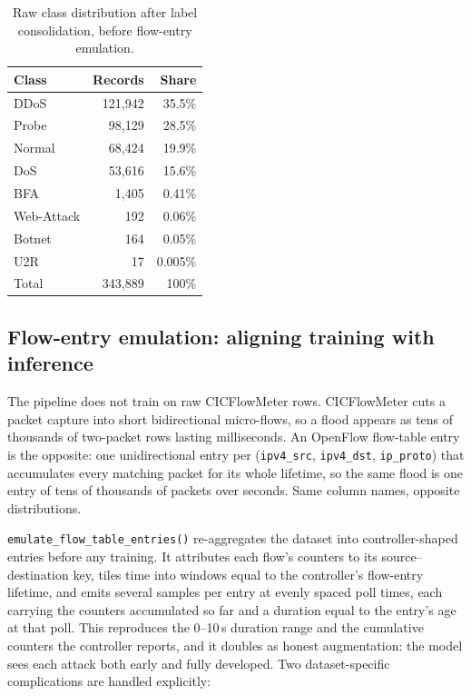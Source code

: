 \documentclass[11pt]{article}
\begin{document}
\begin{table}[h]
\centering
\caption{Raw class distribution after label consolidation, before flow-entry emulation.}
\label{tab:dist}
\begin{tabular}{lrr}
\toprule
Class & Records & Share \\
\midrule
DDoS & 121{,}942 & 35.5\% \\
Probe & 98{,}129 & 28.5\% \\
Normal & 68{,}424 & 19.9\% \\
DoS & 53{,}616 & 15.6\% \\
BFA & 1{,}405 & 0.41\% \\
Web-Attack & 192 & 0.06\% \\
Botnet & 164 & 0.05\% \\
U2R & 17 & 0.005\% \\
\midrule
Total & 343{,}889 & 100\% \\
\bottomrule
\end{tabular}
\end{table}

\subsection{Flow-entry emulation: aligning training with inference}
\label{sec:emulation}
The pipeline does not train on raw CICFlowMeter rows. CICFlowMeter cuts a packet capture
into short bidirectional micro-flows, so a flood appears as tens of thousands of two-packet
rows lasting milliseconds. An OpenFlow flow-table entry is the opposite: one
unidirectional entry per (\texttt{ipv4\_src}, \texttt{ipv4\_dst}, \texttt{ip\_proto}) that
accumulates every matching packet for its whole lifetime, so the same flood is one entry
of tens of thousands of packets over seconds. Same column names, opposite distributions.

\texttt{emulate\_flow\_table\_entries()} re-aggregates the dataset into controller-shaped
entries before any training. It attributes each flow's counters to its
source--destination key, tiles time into windows equal to the controller's flow-entry
lifetime, and emits several samples per entry at evenly spaced poll times, each carrying
the counters accumulated so far and a duration equal to the entry's age at that poll. This
reproduces the 0--10\,s duration range and the cumulative counters the controller reports,
and it doubles as honest augmentation: the model sees each attack both early and fully
developed. Two dataset-specific complications are handled explicitly:
\end{document}
